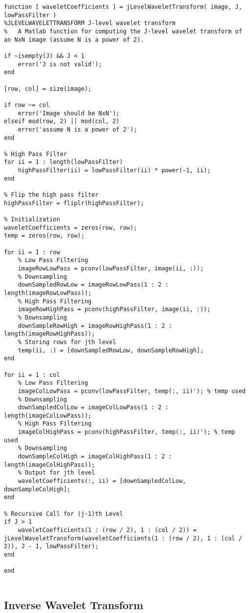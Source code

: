 \documentclass{article}
\begin{document}
\begin{lstlisting}[label=waveletTransform, caption=jLevelWaveletTransform.m]	
function [ waveletCoefficients ] = jLevelWaveletTransform( image, J, lowPassFilter )
%JLEVELWAVELETTRANSFORM J-level wavelet transform
%   A Matlab function for computing the J-level wavelet transform of an NxN image (assume N is a power of 2).

if ~isempty(J) && J < 1
    error('J is not valid');
end

[row, col] = size(image);

if row ~= col
    error('Image should be NxN');
elseif mod(row, 2) || mod(col, 2)
    error('assume N is a power of 2');
end

% High Pass Filter
for ii = 1 : length(lowPassFilter)
    highPassFilter(ii) = lowPassFilter(ii) * power(-1, ii);
end

% Flip the high pass filter
highPassFilter = fliplr(highPassFilter);

% Initialization
waveletCoefficients = zeros(row, row);
temp = zeros(row, row);

for ii = 1 : row
    % Low Pass Filtering
    imageRowLowPass = pconv(lowPassFilter, image(ii, :));
    % Downsampling
    downSampledRowLow = imageRowLowPass(1 : 2 : length(imageRowLowPass));
    % High Pass Filtering
    imageRowHighPass = pconv(highPassFilter, image(ii, :));
    % Downsampling
    downSampleRowHigh = imageRowHighPass(1 : 2 : length(imageRowHighPass));
    % Storing rows for jth level
    temp(ii, :) = [downSampledRowLow, downSampleRowHigh];
end

for ii = 1 : col
    % Low Pass Filtering
    imageColLowPass = pconv(lowPassFilter, temp(:, ii)'); % temp used
    % Downsampling
    downSampledColLow = imageColLowPass(1 : 2 : length(imageColLowPass));
    % High Pass Filtering
    imageColHighPass = pconv(highPassFilter, temp(:, ii)'); % temp used
    % Downsampling
    downSampleColHigh = imageColHighPass(1 : 2 : length(imageColHighPass));
    % Output for jth level
    waveletCoefficients(:, ii) = [downSampledColLow, downSampleColHigh];
end

% Recursive Call for (j-1)th Level
if J > 1
    waveletCoefficients(1 : (row / 2), 1 : (col / 2)) = jLevelWaveletTransform(waveletCoefficients(1 : (row / 2), 1 : (col / 2)), J - 1, lowPassFilter);
end

end


\end{lstlisting}

\subsection{Inverse Wavelet Transform}
\end{document}
